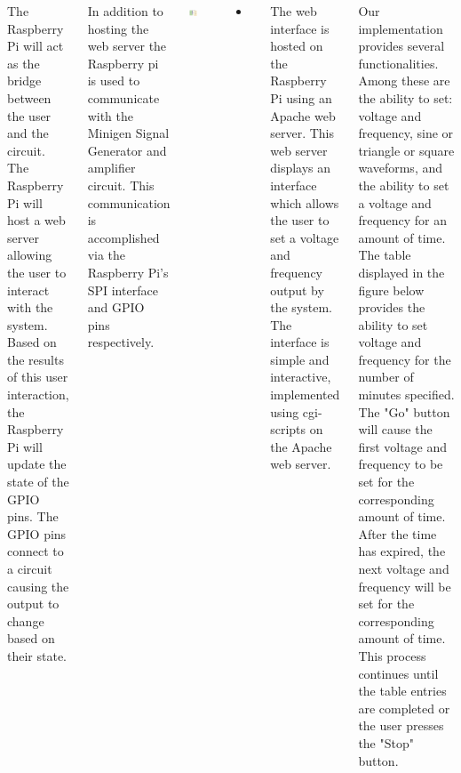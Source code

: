 \documentclass[25pt, a0paper, portrait, margin=0mm, innermargin=15mm, blockverticalspace=15mm, colspace=15mm, subcolspace=8mm]{tikzposter}
\begin{document}
\begin{columns}

%
%
{
The Raspberry Pi will act as the bridge between the user and the circuit.
The Raspberry Pi will host a web server allowing the user to interact with the system.
Based on the results of this user interaction, 
the Raspberry Pi will update the state of the GPIO pins.
The GPIO pins connect to a circuit causing the output to change based on their state. 

In addition to hosting the web server the Raspberry pi is used to
communicate with the 
Minigen Signal Generator and 
amplifier circuit.
This communication is accomplished via 
the Raspberry Pi's SPI interface and
GPIO pins respectively.


\begin{center}
\includegraphics[width=0.35\textwidth,keepaspectratio]{rpi_connection.png}
\end{center}

\begin{itemize}
\item 
\end{itemize}
}

{
The web interface is hosted on the Raspberry Pi using an Apache web server.
This web server displays an interface which allows the user to
set a voltage and frequency output by the system. 
The interface is simple and interactive,
implemented using cgi-scripts on the Apache web server.

Our implementation provides several functionalities.
Among these are
the ability to set:
voltage and frequency,
sine or triangle or square waveforms,
and the ability to set a voltage and frequency for an amount of time.
The table displayed
in the figure below
provides the ability to set voltage and frequency for the number
of minutes specified.
The "Go" button will cause the first
voltage and frequency to be set for the corresponding amount of time.
After the time has expired,
the next voltage and frequency will be set for the corresponding amount of time.
This process continues until the table entries are completed or
the user presses the "Stop" button.

}
\end{columns}
\end{document}
